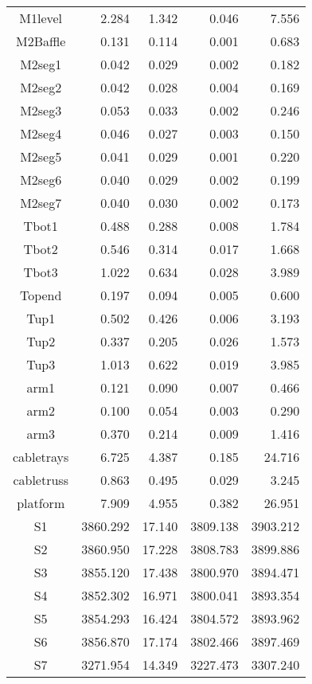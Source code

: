 \begin{longtable}{crrrr}
 M1level & 2.284 & 1.342 & 0.046 & 7.556 \\
 M2Baffle & 0.131 & 0.114 & 0.001 & 0.683 \\
 M2seg1 & 0.042 & 0.029 & 0.002 & 0.182 \\
 M2seg2 & 0.042 & 0.028 & 0.004 & 0.169 \\
 M2seg3 & 0.053 & 0.033 & 0.002 & 0.246 \\
 M2seg4 & 0.046 & 0.027 & 0.003 & 0.150 \\
 M2seg5 & 0.041 & 0.029 & 0.001 & 0.220 \\
 M2seg6 & 0.040 & 0.029 & 0.002 & 0.199 \\
 M2seg7 & 0.040 & 0.030 & 0.002 & 0.173 \\
 Tbot1 & 0.488 & 0.288 & 0.008 & 1.784 \\
 Tbot2 & 0.546 & 0.314 & 0.017 & 1.668 \\
 Tbot3 & 1.022 & 0.634 & 0.028 & 3.989 \\
 Topend & 0.197 & 0.094 & 0.005 & 0.600 \\
 Tup1 & 0.502 & 0.426 & 0.006 & 3.193 \\
 Tup2 & 0.337 & 0.205 & 0.026 & 1.573 \\
 Tup3 & 1.013 & 0.622 & 0.019 & 3.985 \\
 arm1 & 0.121 & 0.090 & 0.007 & 0.466 \\
 arm2 & 0.100 & 0.054 & 0.003 & 0.290 \\
 arm3 & 0.370 & 0.214 & 0.009 & 1.416 \\
 cabletrays & 6.725 & 4.387 & 0.185 & 24.716 \\
 cabletruss & 0.863 & 0.495 & 0.029 & 3.245 \\
 platform & 7.909 & 4.955 & 0.382 & 26.951 \\
 S1 & 3860.292 & 17.140 & 3809.138 & 3903.212 \\
 S2 & 3860.950 & 17.228 & 3808.783 & 3899.886 \\
 S3 & 3855.120 & 17.438 & 3800.970 & 3894.471 \\
 S4 & 3852.302 & 16.971 & 3800.041 & 3893.354 \\
 S5 & 3854.293 & 16.424 & 3804.572 & 3893.962 \\
 S6 & 3856.870 & 17.174 & 3802.466 & 3897.469 \\
 S7 & 3271.954 & 14.349 & 3227.473 & 3307.240 \\
\bottomrule
\end{longtable}

